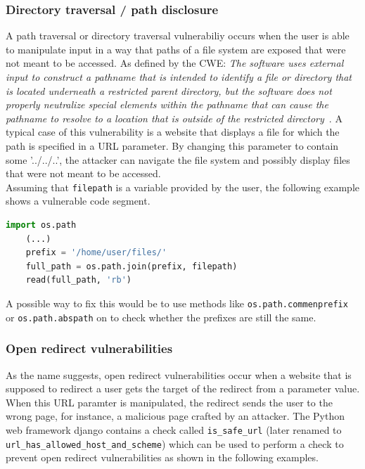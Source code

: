 \documentclass[
a4paper,
pagesize,
pdftex,
12pt,
twoside, %
BCOR=5mm, %
ngerman,
fleqn,
final,
]{scrartcl}
\begin{document}
	\subsubsection{Directory traversal / path disclosure}
	A path traversal or directory traversal vulnerabiliy occurs when the user is able to manipulate input in a way that paths of a file system are exposed that were not meant to be accessed. 
	As defined by the CWE: \textit{The software uses external input to construct a pathname that is intended to identify a file or directory that is located underneath a restricted parent directory, but the software does not properly neutralize special elements within the pathname that can cause the pathname to resolve to a location that is outside of the restricted directory}~\cite{CommonWeaknessEnumeration.19.9.2019c}. A typical case of this vulnerability is a website that displays a file for which the path is specified in a URL parameter. By changing this parameter to contain some '../../..', the attacker can navigate the file system and possibly display files that were not meant to be accessed.\\
	Assuming that \texttt{filepath} is a variable provided by the user, the following example shows a vulnerable code segment.
	\begin{lstlisting}[language=Python, showstringspaces=False]
	import os.path
	(...)
	prefix = '/home/user/files/'
	full_path = os.path.join(prefix, filepath)
	read(full_path, 'rb')
	\end{lstlisting}
	A possible way to fix this would be to use methods like \texttt{os.path.commenprefix} or \texttt{os.path.abspath} on to check whether the prefixes are still the same. 
	
	
	
	\subsubsection{Open redirect vulnerabilities}
	As the name suggests, open redirect vulnerabilities occur when a website that is supposed to redirect a user gets the target of the redirect from a parameter value. When this URL paramter is manipulated, the redirect sends the user to the wrong page, for instance, a malicious page crafted by an attacker. The Python web framework django contains a check called \texttt{is\_safe\_url} (later renamed to \texttt{url\_has\_allowed\_host\_and\_scheme}) which can be used to perform a check to prevent open redirect vulnerabilities as shown in the following examples.
	
\end{document}
